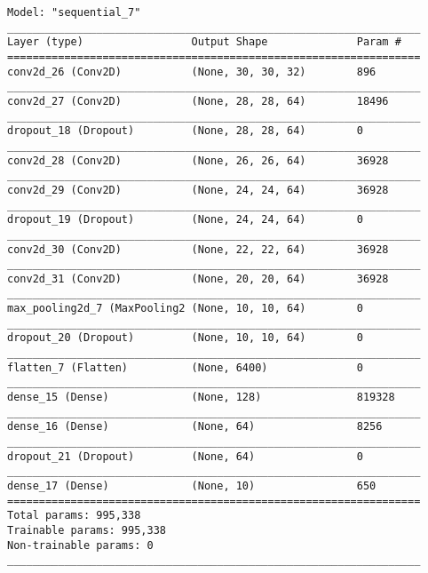 \documentclass{article}
\begin{document}
\begin{lstlisting}[caption={Dropout but with more layers (increased capacity)}, label={lst:1}]
Model: "sequential_7"
_________________________________________________________________
Layer (type)                 Output Shape              Param #   
=================================================================
conv2d_26 (Conv2D)           (None, 30, 30, 32)        896       
_________________________________________________________________
conv2d_27 (Conv2D)           (None, 28, 28, 64)        18496     
_________________________________________________________________
dropout_18 (Dropout)         (None, 28, 28, 64)        0         
_________________________________________________________________
conv2d_28 (Conv2D)           (None, 26, 26, 64)        36928     
_________________________________________________________________
conv2d_29 (Conv2D)           (None, 24, 24, 64)        36928     
_________________________________________________________________
dropout_19 (Dropout)         (None, 24, 24, 64)        0         
_________________________________________________________________
conv2d_30 (Conv2D)           (None, 22, 22, 64)        36928     
_________________________________________________________________
conv2d_31 (Conv2D)           (None, 20, 20, 64)        36928     
_________________________________________________________________
max_pooling2d_7 (MaxPooling2 (None, 10, 10, 64)        0         
_________________________________________________________________
dropout_20 (Dropout)         (None, 10, 10, 64)        0         
_________________________________________________________________
flatten_7 (Flatten)          (None, 6400)              0         
_________________________________________________________________
dense_15 (Dense)             (None, 128)               819328    
_________________________________________________________________
dense_16 (Dense)             (None, 64)                8256      
_________________________________________________________________
dropout_21 (Dropout)         (None, 64)                0         
_________________________________________________________________
dense_17 (Dense)             (None, 10)                650       
=================================================================
Total params: 995,338
Trainable params: 995,338
Non-trainable params: 0
_________________________________________________________________
\end{lstlisting}
\end{document}
